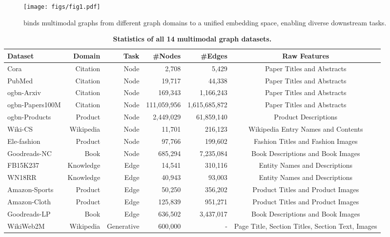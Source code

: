 \appendix
\begin{figure}
    \centering
    \texttt{[image: figs/fig1.pdf]}
    \vskip -0.1in
    \caption{\model binds multimodal graphs from different graph domains to a unified embedding space, enabling diverse downstream tasks.}
    \label{fig:fig1}
\end{figure}

\begin{table*}[t]
\centering
\caption{\textbf{Statistics of all 14 multimodal graph datasets.}}
\label{tab:dataset}
\begin{tabular}{lrrrrc}
\toprule[1.1pt]
Dataset & Domain & Task & \#Nodes & \#Edges & Raw Features \\
\midrule
Cora & Citation & Node  & 2,708 & 5,429  & Paper Titles and Abstracts \\
PubMed & Citation & Node  & 19,717 & 44,338 & Paper Titles and Abstracts \\
ogbn-Arxiv & Citation & Node  & 169,343 & 1,166,243  & Paper Titles and Abstracts \\
ogbn-Papers100M & Citation & Node  & 111,059,956	& 1,615,685,872	& Paper Titles and Abstracts \\
ogbn-Products & Product  & Node & 2,449,029 & 61,859,140 & Product Descriptions \\
Wiki-CS & Wikipedia & Node & 11,701 & 216,123 & Wikipedia Entry Names and Contents \\
Ele-fashion  & Product & Node &  97,766 & 199,602 & Fashion Titles and Fashion Images\\ 
Goodreads-NC & Book & Node &  685,294 & 7,235,084 & Book Descriptions and Book Images \\ 
FB15K237 & Knowledge & Edge & 14,541 & 310,116 &  Entity Names and Descriptions \\
WN18RR & Knowledge & Edge & 40,943 & 93,003 &  Entity Names and Descriptions \\
Amazon-Sports & Product  & Edge & 50,250 & 356,202 & Product Titles and Product Images\\ 
Amazon-Cloth & Product  & Edge  & 125,839 &951,271& Product Titles and Product Images \\ 
Goodreads-LP & Book  & Edge &  636,502 &3,437,017 & Book Descriptions and Book Images \\ 
WikiWeb2M & Wikipedia & Generative & 600,000 & - & Page Title, Section Titles, Section Text, Images\\

\bottomrule[1.1pt]
\end{tabular}
\end{table*}

